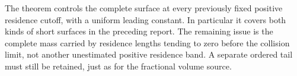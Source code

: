 The theorem controls the complete surface at every previously fixed
positive residence cutoff, with a uniform leading constant. In
particular it covers both kinds of short surfaces in the preceding
report. The remaining issue is the complete mass carried by residence
lengths tending to zero before the collision limit, not another
unestimated positive residence band. A separate ordered tail must
still be retained, just as for the fractional volume source.
